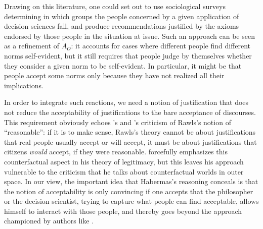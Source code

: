 \documentclass[preprint, french, english, 11pt, authoryear]{elsarticle}%
\begin{document}
Drawing on this literature, one could set out to use sociological surveys determining in which groups the people concerned by a given application of decision sciences fall, and produce recommendations justified by the axioms endorsed by those people in the situation at issue. 
Such an approach can be seen as a refinement of $A_O$: it accounts for cases where different people find different norms self-evident, but it still requires that people judge by themselves whether they consider a given norm to be self-evident. 
In particular, it might be that people accept some norms only because they have not realized all their implications.

In order to integrate such reactions, we need a notion of justification that does not reduce the acceptability of justifications to the bare acceptance of discourses. 
This requirement obviously echoes \citeauthor{habermas_reconciliation_1995}’s and \citeauthor{estlund_democratic_2009}’s criticism of Rawls's notion of “reasonable”: 
if it is to make sense, Rawls's theory cannot be about justifications that real people usually accept or will accept, it must be about justifications that citizens \emph{would} accept, if they were reasonable. 
\citet{habermas_faktizitat_1992} forcefully emphasizes this counterfactual aspect in his theory of legitimacy, but this leaves his approach vulnerable to the criticism that he talks about counterfactual worlds in outer space. 
In our view, the important idea that Habermas's reasoning conceals is that the notion of acceptability is only convincing if one accepts that the philosopher or the decision scientist, trying to capture what people can find acceptable, 
allows himself to interact with those people, and thereby goes beyond the approach championed by authors like \cite{boltanski_justification_2006}.
\end{document}
